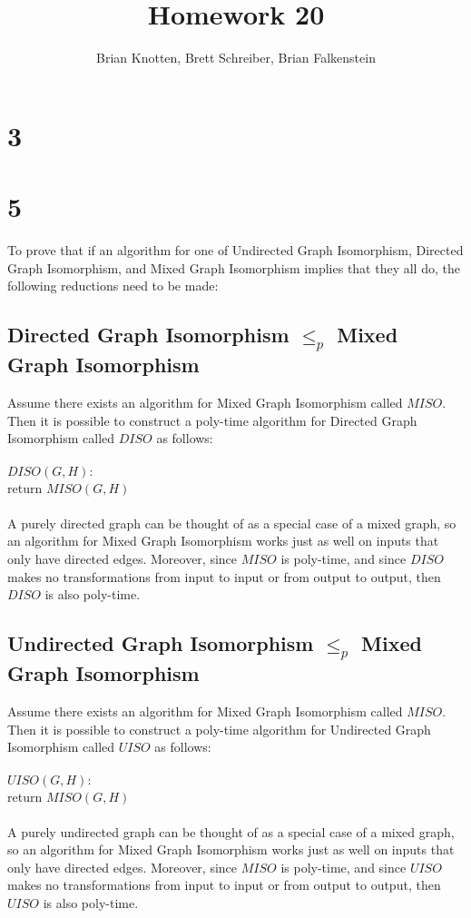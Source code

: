 \documentclass[letterpaper,notitlepage,twoside]{article}
\newcommand\tab[1][1cm]{\hspace*{#1}} %
\begin{document}
\title{Homework 20}
\author{Brian Knotten, Brett Schreiber, Brian Falkenstein}
\maketitle
\section*{3}

\section*{5}
To prove that if an algorithm for one of Undirected Graph Isomorphism, Directed Graph Isomorphism, and Mixed Graph Isomorphism implies that they all do, the following reductions need to be made:

\subsection*{Directed Graph Isomorphism $\leq_p$ Mixed Graph Isomorphism}
Assume there exists an algorithm for Mixed Graph Isomorphism called $MISO$. Then it is possible to construct a poly-time algorithm for Directed Graph Isomorphism called $DISO$ as follows:
\\\\
$DISO(G, H):$\\
\tab return $MISO(G, H)$
\\\\
A purely directed graph can be thought of as a special case of a mixed graph, so an algorithm for Mixed Graph Isomorphism works just as well on inputs that only have directed edges. Moreover, since $MISO$ is poly-time, and since $DISO$ makes no transformations from input to input or from output to output, then $DISO$ is also poly-time.

\subsection*{Undirected Graph Isomorphism $\leq_p$ Mixed Graph Isomorphism}
Assume there exists an algorithm for Mixed Graph Isomorphism called $MISO$. Then it is possible to construct a poly-time algorithm for Undirected Graph Isomorphism called $UISO$ as follows:
\\\\
$UISO(G, H):$\\
\tab return $MISO(G, H)$
\\\\
A purely undirected graph can be thought of as a special case of a mixed graph, so an algorithm for Mixed Graph Isomorphism works just as well on inputs that only have directed edges. Moreover, since $MISO$ is poly-time, and since $UISO$ makes no transformations from input to input or from output to output, then $UISO$ is also poly-time.
\end{document}
